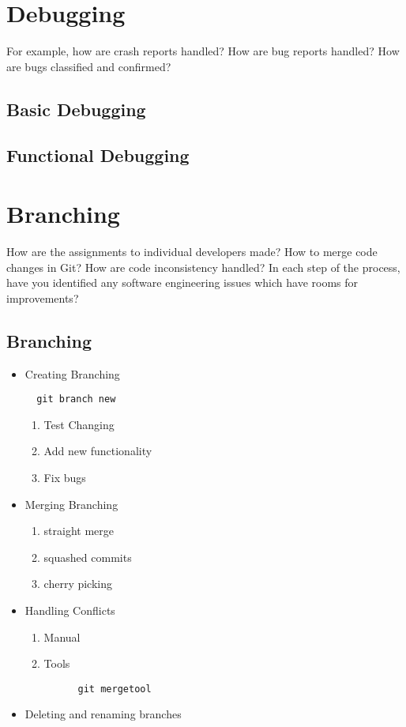 \documentclass[draftclsnofoot,journal,onecolumn,12pt]{IEEEtran}
\begin{document}
\section{Debugging}

For example, how are crash reports handled? How are bug reports handled? How are bugs classified and confirmed?

\subsection{Basic Debugging}

\subsection{Functional Debugging}

\section{Branching}

How are the assignments to individual developers made? How to merge code changes in Git? How are code inconsistency handled? In each step of the process, have you identified any software engineering issues which have rooms for improvements?

\subsection{Branching}

\begin{itemize}
\item Creating Branching
\begin{verbatim}
  git branch new
\end{verbatim}
  \begin{enumerate}
    \item Test Changing
    \item Add new functionality
    \item Fix bugs
  \end{enumerate}
\item Merging Branching
  \begin{enumerate}
    \item straight merge
    \item squashed commits
    \item cherry picking
  \end{enumerate}
\item Handling Conflicts
  \begin{enumerate}
    \item Manual
    \item Tools
    \begin{verbatim}
      git mergetool
\end{verbatim}
  \end{enumerate}
\item Deleting and renaming branches
\end{itemize}
\end{document}
